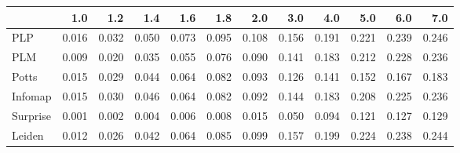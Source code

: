 \begin{tabular}{lrrrrrrrrrrr}
\toprule
{} &   1.0 &   1.2 &   1.4 &   1.6 &   1.8 &   2.0 &   3.0 &   4.0 &   5.0 &   6.0 &   7.0 \\
\midrule
PLP      & 0.016 & 0.032 & 0.050 & 0.073 & 0.095 & 0.108 & 0.156 & 0.191 & 0.221 & 0.239 & 0.246 \\
PLM      & 0.009 & 0.020 & 0.035 & 0.055 & 0.076 & 0.090 & 0.141 & 0.183 & 0.212 & 0.228 & 0.236 \\
Potts    & 0.015 & 0.029 & 0.044 & 0.064 & 0.082 & 0.093 & 0.126 & 0.141 & 0.152 & 0.167 & 0.183 \\
Infomap  & 0.015 & 0.030 & 0.046 & 0.064 & 0.082 & 0.092 & 0.144 & 0.183 & 0.208 & 0.225 & 0.236 \\
Surprise & 0.001 & 0.002 & 0.004 & 0.006 & 0.008 & 0.015 & 0.050 & 0.094 & 0.121 & 0.127 & 0.129 \\
Leiden   & 0.012 & 0.026 & 0.042 & 0.064 & 0.085 & 0.099 & 0.157 & 0.199 & 0.224 & 0.238 & 0.244 \\
\bottomrule
\end{tabular}
